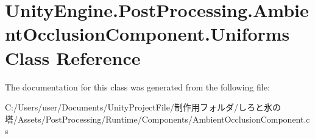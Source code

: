 \hypertarget{class_unity_engine_1_1_post_processing_1_1_ambient_occlusion_component_1_1_uniforms}{}\section{Unity\+Engine.\+Post\+Processing.\+Ambient\+Occlusion\+Component.\+Uniforms Class Reference}
\label{class_unity_engine_1_1_post_processing_1_1_ambient_occlusion_component_1_1_uniforms}


The documentation for this class was generated from the following file\+:\begin{DoxyCompactItemize}
\item 
C\+:/\+Users/user/\+Documents/\+Unity\+Project\+File/制作用フォルダ/しろと氷の塔/\+Assets/\+Post\+Processing/\+Runtime/\+Components/Ambient\+Occlusion\+Component.\+cs\end{DoxyCompactItemize}
